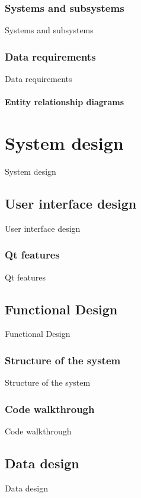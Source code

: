 \documentclass[12pt]{report}
\begin{document}
\section{Systems and subsystems}
Systems and subsystems

\section{Data requirements}
Data requirements

\subsection{Entity relationship diagrams}


\part{System design}
System design

\chapter{User interface design}
User interface design

\section{Qt features}
Qt features

\chapter{Functional Design}
Functional Design

\section{Structure of the system}
Structure of the system

\section{Code walkthrough}
Code walkthrough


\chapter{Data design}
Data design
\end{document}
